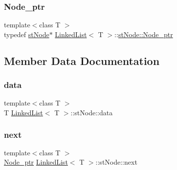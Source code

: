 \subsubsection{\texorpdfstring{Node\+\_\+ptr}{Node\_ptr}}
{\footnotesize\ttfamily template$<$class T $>$ \\
typedef \hyperlink{struct_linked_list_1_1st_node}{st\+Node}$\ast$ \hyperlink{class_linked_list}{Linked\+List}$<$ T $>$\+::\hyperlink{struct_linked_list_1_1st_node_a278875c2a2b254131663e0e3e5e8acd1}{st\+Node\+::\+Node\+\_\+ptr}}



\subsection{Member Data Documentation}
\mbox{\label{struct_linked_list_1_1st_node_a3d05f857dd38ee6169bf6e439be75aa9}} 
\subsubsection{\texorpdfstring{data}{data}}
{\footnotesize\ttfamily template$<$class T $>$ \\
T \hyperlink{class_linked_list}{Linked\+List}$<$ T $>$\+::st\+Node\+::data}

\mbox{\label{struct_linked_list_1_1st_node_afc9002d9d8db58e40ee1e56767c0afd4}} 
\subsubsection{\texorpdfstring{next}{next}}
{\footnotesize\ttfamily template$<$class T $>$ \\
\hyperlink{struct_linked_list_1_1st_node_a278875c2a2b254131663e0e3e5e8acd1}{Node\+\_\+ptr} \hyperlink{class_linked_list}{Linked\+List}$<$ T $>$\+::st\+Node\+::next}

\mbox{\label{struct_linked_list_1_1st_node_afc151ad2c6e60bb7ea299bcd1aabcf73}} 
